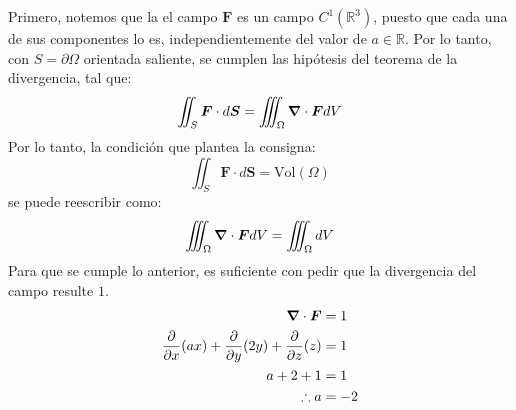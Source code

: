 \begin{solution}
    Primero, notemos que la el campo $\boldsymbol{F}$ es un campo $C^1(\mathbb{R}^3)$, puesto que
    cada una de sus componentes lo es, independientemente del valor de $a \in \mathbb{R}$.
    Por lo tanto, con $S = \partial \Omega$ orientada saliente, se cumplen las hipótesis del
    teorema de la divergencia, tal que:
    \begin{equation*}
        \iint_S \boldsymbol{F} \cdot d\boldsymbol{S} = \iiint_\Omega \grad \cdot \boldsymbol{F} dV
    \end{equation*}
    Por lo tanto, la condición que plantea la consigna:
    \begin{equation*}
        \iint_S \boldsymbol{F} \cdot d\boldsymbol{S} = \text{Vol}(\Omega)
    \end{equation*}
    se puede reescribir como:
    \begin{equation*}
        \iiint_\Omega \grad \cdot \boldsymbol{F} dV = \iiint_\Omega dV
    \end{equation*}
    Para que se cumple lo anterior, es suficiente con pedir que la divergencia del campo resulte $1$.
    \begin{align*}
        \grad \cdot \boldsymbol{F} &= 1 \\
        \frac{\partial}{\partial x}(ax) + \frac{\partial}{\partial y}(2y) + \frac{\partial}{\partial z}(z) &= 1 \\
        a + 2 + 1 &= 1 \\
        \therefore a &= -2
    \end{align*}
\end{solution}